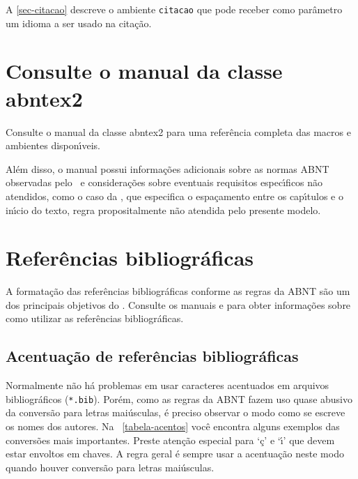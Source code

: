 A \autoref{sec-citacao} descreve o ambiente \texttt{citacao} que pode receber
como par\^{a}metro um idioma a ser usado na cita\c{c}\~{a}o.

\section{Consulte o manual da classe \textsf{abntex2}}

Consulte o manual da classe \textsf{abntex2} \cite{abntex2classe} para uma
refer\^{e}ncia completa das macros e ambientes dispon\'{\i}veis.

Al\'{e}m disso, o manual possui informa\c{c}\~{o}es adicionais sobre as normas ABNT
observadas pelo \abnTeX\ e considera\c{c}\~{o}es sobre eventuais requisitos espec\'{\i}ficos
n\~{a}o atendidos, como o caso da , que
especifica o espa\c{c}amento entre os cap\'{\i}tulos e o in\'{\i}cio do texto, regra
propositalmente n\~{a}o atendida pelo presente modelo.

\section{Refer\^{e}ncias bibliogr\'{a}ficas}

A formata\c{c}\~{a}o das refer\^{e}ncias bibliogr\'{a}ficas conforme as regras da ABNT s\~{a}o um
dos principais objetivos do \abnTeX. Consulte os manuais
 e  para obter informa\c{c}\~{o}es
sobre como utilizar as refer\^{e}ncias bibliogr\'{a}ficas.

\subsection{Acentua\c{c}\~{a}o de refer\^{e}ncias bibliogr\'{a}ficas}

Normalmente n\~{a}o h\'{a} problemas em usar caracteres acentuados em arquivos
bibliogr\'{a}ficos (\texttt{*.bib}). Por\'{e}m, como as regras da ABNT fazem uso quase
abusivo da convers\~{a}o para letras mai\'{u}sculas, \'{e} preciso observar o modo como se
escreve os nomes dos autores. Na ~\autoref{tabela-acentos} voc\^{e} encontra alguns
exemplos das convers\~{o}es mais importantes. Preste aten\c{c}\~{a}o especial para `\c{c}' e `\'{\i}'
que devem estar envoltos em chaves. A regra geral \'{e} sempre usar a acentua\c{c}\~{a}o
neste modo quando houver convers\~{a}o para letras mai\'{u}sculas.

